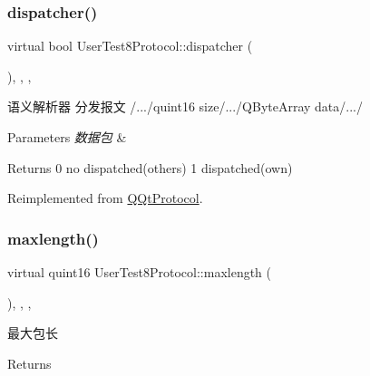 \subsubsection{\texorpdfstring{dispatcher()}{dispatcher()}}
{\footnotesize\ttfamily virtual bool User\+Test8\+Protocol\+::dispatcher (\begin{DoxyParamCaption}\item[{const Q\+Byte\+Array \&}]{ }\end{DoxyParamCaption})\hspace{0.3cm}{\ttfamily [inline]}, {\ttfamily [override]}, {\ttfamily [protected]}, {\ttfamily [virtual]}}



语义解析器 分发报文 /.../quint16 size/.../\+Q\+Byte\+Array data/.../ 


\begin{DoxyParams}{Parameters}
{\em 数据包} & \\
\hline
\end{DoxyParams}
\begin{DoxyReturn}{Returns}
0 no dispatched(others) 1 dispatched(own) 
\end{DoxyReturn}


Reimplemented from \mbox{\hyperlink{class_q_qt_protocol_a35a69c4b89c8cf7459038f40d75e0dc9}{Q\+Qt\+Protocol}}.

\mbox{\label{class_user_test8_protocol_a4358fee213c86498f67992fc620c290e}} 
\subsubsection{\texorpdfstring{maxlength()}{maxlength()}}
{\footnotesize\ttfamily virtual quint16 User\+Test8\+Protocol\+::maxlength (\begin{DoxyParamCaption}{ }\end{DoxyParamCaption})\hspace{0.3cm}{\ttfamily [inline]}, {\ttfamily [override]}, {\ttfamily [protected]}, {\ttfamily [virtual]}}



最大包长 

\begin{DoxyReturn}{Returns}

\end{DoxyReturn}


